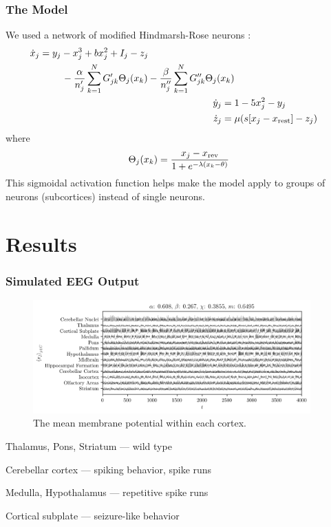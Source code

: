 \documentclass[hyperref={hidelinks}]{beamer}
\newcommand*{\hrx}{x}
\newcommand*{\hry}{y}
\newcommand*{\hrz}{z}
\newcommand*{\hra}{\alpha}
\newcommand*{\hrb}{\beta}
\begin{document}
\begin{frame}
  \frametitle{The Model}
  We used a network of modified Hindmarsh-Rose neurons \cite{Santos2017}:
  \begin{align}
    \label{eq:hr_x}
    \begin{split}
      \dot{\hrx}_{j}
      ={}&
      \hry_{j}
      -
      \hrx_{j}^{3}
      +
      b \hrx_{j}^{2}
      +
      I_{j}
      -
      \hrz_{j} \\
      &\quad -
      \frac{\hra}{n'_{j}} \sum_{k ={} 1}^{N} G'_{j k} \Theta_{j}(\hrx_{k})
      -
      \frac{\hrb}{n''_{j}} \sum_{k ={} 1}^{N} G''_{j k} \Theta_{j}(\hrx_{k})
    \end{split} \\
    \label{eq:hr_y}
    \dot{\hry}_{j}
    ={}&
         1
         -
         5 \hrx_{j}^{2}
         -
         \hry_{j} \\
    \label{eq:hr_z}
    \dot{\hrz}_{j}
    ={}&
         \mu \pqty{s \bqty{\hrx_{j} - \hrx_{\text{rest}}} - \hrz_{j}}
  \end{align}
  where
  \begin{equation}
    \label{eq:hr_sigmoid}
    \Theta_{j}(\hrx_{k})
    =
    \frac{\hrx_{j} - \hrx_{\text{rev}}}{1 + e^{-\lambda \pqty{\hrx_{k} - \theta}}}
  \end{equation}
  This sigmoidal activation function helps make the model apply to groups of neurons (subcortices) instead of single neurons.

\end{frame}

\section{Results}
\begin{frame}
  \frametitle{Simulated EEG Output}
  \begin{figure}[ht]
    \centering
    \includegraphics[width=0.95\textwidth]{figure/means-0_608-0_267}
    \caption[Mean potential by cortex]{The mean membrane potential within each cortex.
    }
    \label{fig:mean_608_267}
  \end{figure}
  Thalamus, Pons, Striatum --- wild type

  Cerebellar cortex --- spiking behavior, spike runs

  Medulla, Hypothalamus --- repetitive spike runs

  Cortical subplate --- seizure-like behavior

\end{frame}
\end{document}

